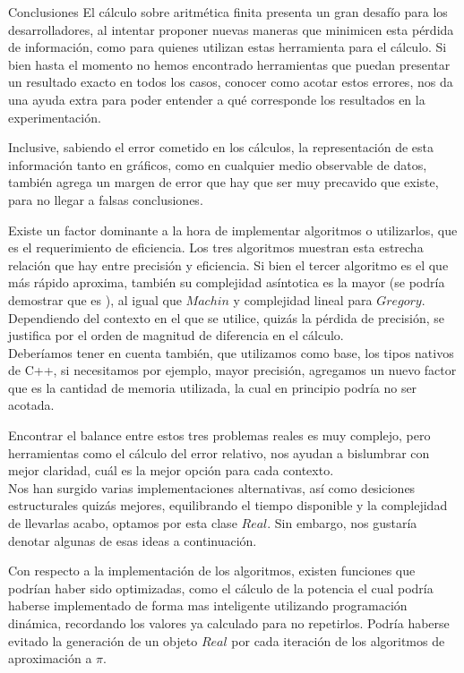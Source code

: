 \begin{section}{Conclusiones}
	El cálculo sobre aritmética finita presenta un gran desafío para los desarrolladores, al intentar proponer nuevas maneras que minimicen esta pérdida de información, como para quienes utilizan estas herramienta para el cálculo. Si bien hasta el momento no hemos encontrado herramientas que puedan presentar un resultado exacto en todos los casos, conocer como acotar estos errores, nos da una ayuda extra para poder entender a qué corresponde los resultados en la experimentación.

	Inclusive, sabiendo el error cometido en los cálculos, la representación de esta información tanto en gráficos, como en cualquier medio observable de datos, también agrega un margen de error que hay que ser muy precavido que existe, para no llegar a falsas conclusiones.
	
	Existe un factor dominante a la hora de implementar algoritmos o utilizarlos, que es el requerimiento de eficiencia. Los tres algoritmos muestran esta estrecha relación que hay entre precisión y eficiencia. Si bien el tercer algoritmo es el que más rápido aproxima, también su complejidad asíntotica es la mayor (se podría demostrar que es ), al igual que $Machin$ y complejidad lineal para $Gregory$. Dependiendo del contexto en el que se utilice, quizás la pérdida de precisión, se justifica por el orden de magnitud de diferencia en el cálculo.\\
	
	Deberíamos tener en cuenta también, que utilizamos como base, los tipos nativos de C++, si necesitamos por ejemplo, mayor precisión, agregamos un nuevo factor que es la cantidad de memoria utilizada, la cual en principio podría no ser acotada.
	
	Encontrar el balance entre estos tres problemas reales es muy complejo, pero herramientas como el cálculo del error relativo, nos ayudan a bislumbrar con mejor claridad, cuál es la mejor opción para cada contexto.\\
	
	Nos han surgido varias implementaciones alternativas, así como desiciones estructurales quizás mejores, equilibrando el tiempo disponible y la complejidad de llevarlas acabo, optamos por esta clase $Real$. Sin embargo, nos gustaría denotar algunas de esas ideas a continuación.
	
	Con respecto a la implementación de los algoritmos, existen funciones que podrían haber sido optimizadas, como el cálculo de la potencia el cual podría haberse implementado de forma mas inteligente utilizando programación dinámica, recordando los valores ya calculado para no repetirlos. Podría haberse evitado la generación de un objeto $Real$ por cada iteración de los algoritmos de aproximación a $\pi$.


\end{section}
